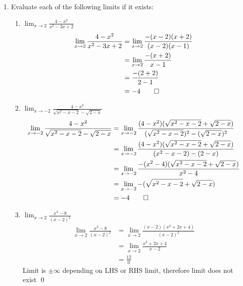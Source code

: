 \documentclass[12pt, a4paper]{article}
\begin{document}
\begin{enumerate}[Q\arabic*.]
\item Evaluate each of the following limits if it exists:
  \begin{enumerate}[(\alph*)]
    \item $\displaystyle \lim_{x\to2}\frac{4-x^2}{x^2-3x+2}$
      \begin{align*}
        \lim_{x\to2}\frac{4-x^2}{x^2-3x+2} &=  \lim_{x\to2}\frac{-(x-2)(x+2)}{(x-2)(x-1)} \\
                                           &=  \lim_{x\to2}\frac{-(x+2)}{x-1} \\
                                           &= \frac{-(2+2)}{2-1} \\
                                           &= -4 \qed
      \end{align*}
    \item $\displaystyle \lim_{x\to-2}\frac{4-x^2}{\sqrt{x^2-x-2}-\sqrt{2-x}}$
      \begin{align*}
        \lim_{x\to-2}\frac{4-x^2}{\sqrt{x^2-x-2}-\sqrt{2-x}} &= \lim_{x\to-2}\frac{(4-x^2)(\sqrt{x^2-x-2}+\sqrt{2-x})}{(\sqrt{x^2-x-2})^2-(\sqrt{2-x})^2} \\
                                                             &= \lim_{x\to-2}\frac{(4-x^2)(\sqrt{x^2-x-2}+\sqrt{2-x})}{(x^2-x-2)-(2-x)} \\
                                                             &= \lim_{x\to-2}\frac{-(x^2-4)(\sqrt{x^2-x-2}+\sqrt{2-x})}{x^2-4} \\
                                                             &= \lim_{x\to-2}-(\sqrt{x^2-x-2}+\sqrt{2-x}) \\
                                                             &= -4 \qed
      \end{align*}
    \item $\displaystyle \lim_{x\to2}\frac{x^3-8}{(x-2)^2}$
      \begin{align*}
        \lim_{x\to2}\frac{x^3-8}{(x-2)^2} &= \lim_{x\to2}\frac{(x-2)(x^2+2x+4)}{(x-2)^2} \\
                                          &= \lim_{x\to2}\frac{x^2+2x+4}{x-2} \\
                                          &= \frac{12}{0}
      \end{align*}
       Limit is $\pm\infty$ depending on LHS or RHS limit, therefore limit does not exist \qed
  \end{enumerate}


\end{enumerate}
\end{document}
